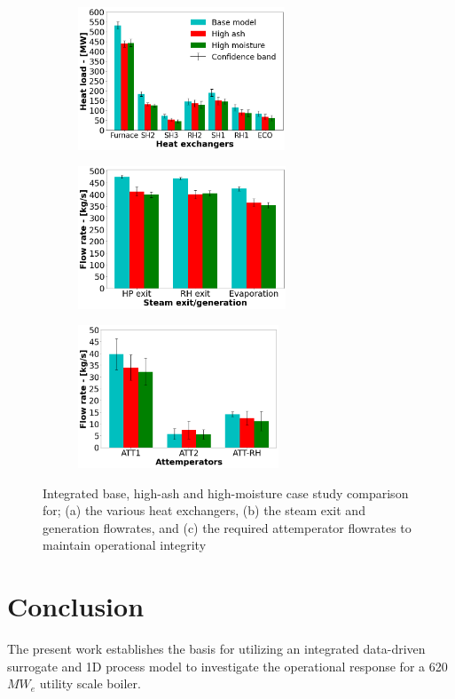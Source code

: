 \documentclass[a4paper,fleqn]{cas-sc}
\begin{document}
\begin{figure}
\centering
\begin{subfigure}{0.33\textwidth}
    \includegraphics[width=\textwidth, height = 4.25cm]{100_FUEL_CASE}
    \caption{}
\end{subfigure}\hfill %
\begin{subfigure}{0.33\textwidth}
    \includegraphics[width=\linewidth, height = 4.25cm]{100_FUEL_CASE_STEAM}
    \caption{}
\end{subfigure}\hfill
\begin{subfigure}{0.33\textwidth}
    \includegraphics[width=\linewidth, height = 4.25cm]{100_FUEL_CASE_ATTEMP}
    \caption{}
\end{subfigure}
\caption{Integrated base, high-ash and high-moisture case study comparison for; (a) the various heat exchangers, (b) the steam exit and generation flowrates, and (c) the required attemperator flowrates to maintain operational integrity}
\label{fig_fuel_results}
\end{figure}

\section{Conclusion}
The present work establishes the basis for utilizing an integrated data-driven surrogate and 1D process model to investigate the operational response for a 620 $MW_e$ utility scale boiler.\\
\end{document}
